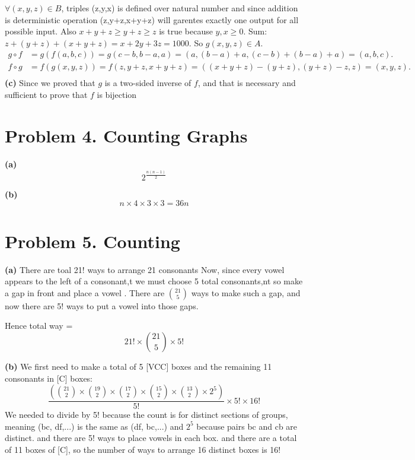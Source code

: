 \documentclass{article}
\begin{document}
$\forall (x,y,z) \in B$, triples (z,y,x) is defined over natural number and since addition is deterministic operation (z,y+z,x+y+z) will
garentes exactly one output for all possible input. Also $x+y+z \geq y+z \geq z$ is true because $y,x \geq 0$. 
Sum: $z + (y+z) + (x+y+z) = x + 2y + 3z = 1000$. So $g(x,y,z) \in A$.
\[
\begin{aligned}
    g \circ f &= g(f(a,b,c)) = g(c-b, b-a, a) = (a, (b-a)+a, (c-b)+(b-a)+a) = (a, b, c).\\ 
    f \circ  g &= f(g(x,y,z)) = f(z, y+z, x+y+z) = ((x+y+z)-(y+z), (y+z)-z, z) = (x, y, z).\\
\end{aligned}
\]
\vspace{\baselineskip}
\noindent\textbf{(c)} Since we proved that $g$ is a two-sided inverse of $f$, and that is necessary and sufficient to prove that $f$
is bijection


\section*{Problem 4. Counting Graphs}
\textbf{(a)} \[2^{\frac{n(n-1)}{2}}\]


\vspace{\baselineskip}
\noindent\textbf{(b)} \[n \times 4 \times 3 \times 3 = 36n\]



\section*{Problem 5. Counting}
\textbf{(a)} There are toal 21! ways to arrange 21 consonants
Now, since every vowel appears to the left of a consonant,t we must choose 5 total consonants,nt so make a gap in front and place a vowel
. There are $\binom{21}{5}$ ways to make such a gap, and now there are 5! ways to put a vowel into those gaps.

Hence total way = \[21! \times \binom{21}{5} \times 5!\]

\vspace{\baselineskip}
\noindent\textbf{(b)}
We first need to make a total of 5 [VCC] boxes and the remaining 11 consonants in [C] boxes:
\[ \frac{\left( \binom{21}{2} \times \binom{19}{2} \times \binom{17}{2} \times \binom{15}{2} \times \binom{13}{2} \times 2^5 \right)}{5!} \times 5! \times 16!\]
We needed to divide by 5! because the count is for distinct sections of groups, meaning (bc, df,...) is the same as (df, bc,...)
and $2^5$ because pairs bc and cb are distinct. and there are 5! ways to place vowels in each box.
and there are a total of 11 boxes of [C], so the number of ways to arrange 16 distinct boxes is 16!
\end{document}
